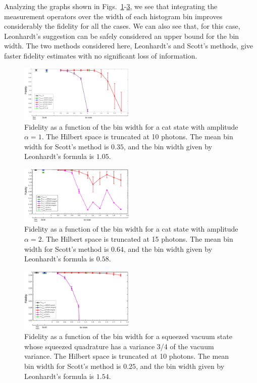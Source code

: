 \documentclass[
reprint,
superscriptaddress,
showpacs,
amsmath,
amssymb,
aps,
pra,
longbibliography
]{revtex4-1}
\begin{document}
Analyzing the graphs shown in Figs.~\ref{fig-Fidelity_vs_binwidth_catstate_Mph_10_alpha_1}-\ref{fig-squeezed_vacuum_variance_075_Mph_10}, we see that integrating the measurement operators over the width of each histogram bin improves considerably the fidelity for all the cases. We can also see that, for this case, Leonhardt's suggestion can be safely considered an upper bound for the bin width. The two methods considered here, Leonhardt's and Scott's methods, give faster fidelity estimates with no significant loss of information.
   
\begin{figure}[h]
\includegraphics[width=0.49\textwidth]{fid_vs_binwidth_catstate_alpha_1_mph_10.eps}
\caption{Fidelity as a function of the bin width for a cat state with amplitude
$\alpha = 1$. The Hilbert space is truncated at 10 photons. The mean bin width for Scott's method is $0.35$, and the bin width given by Leonhardt's formula is $1.05$.}
\label{fig-Fidelity_vs_binwidth_catstate_Mph_10_alpha_1}
\end{figure}

\begin{figure}[h]
\includegraphics[width=0.49\textwidth]{fidelity_vs_binwidth_catstate_alpha_2.eps}
\caption{Fidelity as a function of the bin width for a cat state with amplitude
$\alpha = 2$. The Hilbert space is truncated at 15 photons. The mean bin width for Scott's method is $0.64$, and the bin width given by Leonhardt's formula is $0.58$.}
\label{fig-Fid_vs_binwidth_catstate_alpha_2_Mph_15}
\end{figure}

\begin{figure}[h]
\includegraphics[width=0.49\textwidth]{squeezed_vacuum_variance_075_Mph_10.eps}
\caption{Fidelity as a function of the bin width for a squeezed vacuum state whose squeezed quadrature has a variance 3/4 of the vacuum variance. The Hilbert space is truncated at 10 photons. The mean bin width for Scott's method is $0.25$, and the bin width given by Leonhardt's formula is $1.54$.}
\label{fig-squeezed_vacuum_variance_075_Mph_10}
\end{figure}
\end{document}
